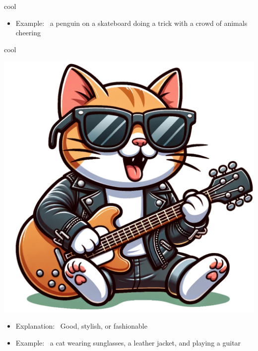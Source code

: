 \documentclass[avery5371, grid,frame]{flashcards}
\begin{document}
\begin{flashcard}{cool}
\begin{center}
\begin{minipage}[c]{.45\textwidth}
\begin{itemize}
            \item Example: \ a penguin on a skateboard doing a trick with a crowd of animals cheering
            \end{itemize}
        \end{minipage}
    \end{center}
    \vspace*{\fill}
\end{flashcard}\begin{flashcard}{cool}
    \vspace*{\fill}
    \begin{center}
        \begin{minipage}[c]{.45\textwidth}
            \includegraphics[width=\textwidth]{cards/c/cool/cool - a cat wearing sunglasses, a leather jacket, and playing a guitar.png}
        \end{minipage}
        \begin{minipage}[c]{.45\textwidth}
            \begin{itemize}\setlength\itemsep{12pt}
            \item Explanation: \ Good, stylish, or fashionable

            \item Example: \ a cat wearing sunglasses, a leather jacket, and playing a guitar
            \end{itemize}
        \end{minipage}
    \end{center}
    \vspace*{\fill}
\end{flashcard}
\end{document}
